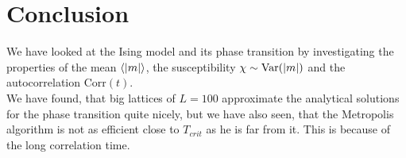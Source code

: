\section{Conclusion}

We have looked at the Ising model and its phase transition by investigating the properties of the mean $\left\langle\left\vert m \right\vert\right\rangle$, the susceptibility $\chi \sim \text{Var}(\left\vert m \right\vert)$ and the autocorrelation Corr$(t)$.\\
We have found, that big lattices of $L = 100$ approximate the analytical solutions for the phase transition quite nicely, but we have also seen, that the Metropolis algorithm is not as efficient close to $T_{crit}$ as he is far from it. This is because of the long correlation time.
